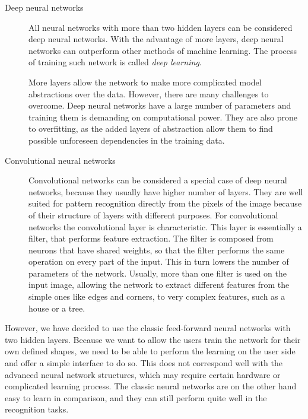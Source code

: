 \begin{description}
\item [Deep neural networks]
All neural networks with more than two hidden layers can be considered deep neural networks. With the advantage of more layers, deep neural networks can outperform other methods of machine learning. The process of training such network is called \emph{deep learning}. 

More layers allow the network to make more complicated model abstractions over the data. However, there are many challenges to overcome. Deep neural networks have a large number of parameters and training them is demanding on computational power. They are also prone to overfitting, as the added layers of abstraction allow them to find possible unforeseen dependencies in the training data.

\item [Convolutional neural networks]
Convolutional networks can be considered a special case of deep neural networks, because they usually have higher number of layers. They are well suited for pattern recognition directly from the pixels of the image because of their structure of layers with different purposes.
For convolutional networks the convolutional layer is characteristic. This layer is essentially a filter, that performs feature extraction. The filter is composed from neurons that have shared weights, so that the filter performs the same operation on every part of the input. This in turn lowers the number of parameters of the network. Usually, more than one filter is used on the input image, allowing the network to extract different features from the simple ones like edges and corners, to very complex features, such as a house or a tree.
\end{description}

However, we have decided to use the classic feed-forward neural networks with two hidden layers. Because we want to allow the users train the network for their own defined shapes, we need to be able to perform the learning on the user side and offer a simple interface to do so. 
This does not correspond well with the advanced neural network structures, which may require certain hardware or complicated learning process. The classic neural networks are on the other hand easy to learn in comparison, and they can still perform quite well in the recognition tasks.

